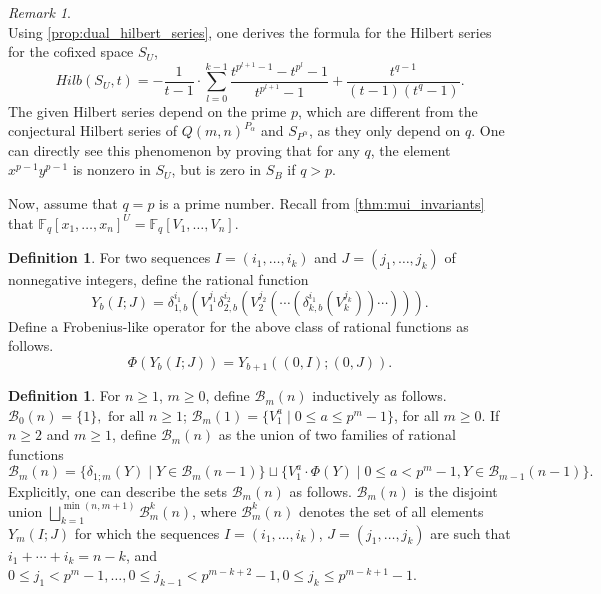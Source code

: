 \documentclass[12pt,a4paper]{report}
\theoremstyle{definition}
\newtheorem{definition}[theorem]{Definition}
\theoremstyle{remark}
\newtheorem*{remark}{Remark}
\theoremstyle{definition}
\begin{document}
\begin{remark}
\begin{equation*}
\end{equation*}
Using \cref{prop:dual_hilbert_series}, one derives the formula for the Hilbert series for the cofixed space $S_U$,
\begin{equation*}
    Hilb(S_U, t) = -\dfrac{1}{t-1}\cdot \sum\limits_{l=0}^{k-1}\dfrac{t^{p^{l+1}-1}-t^{p^l}-1}{t^{p^{l+1}}-1}+ \dfrac{t^{q-1}}{(t-1)(t^{q}-1)}.
\end{equation*}
The given Hilbert series depend on the prime $p$, which are different from the conjectural Hilbert series of $Q(m, n)^{P_{\alpha}}$ and $S_{P^{\alpha}}$, as they only depend on $q$. One can directly see this phenomenon by proving that for any $q$, the element $x^{p-1}y^{p-1}$ is nonzero in $S_U$, but is zero in $S_B$ if $q>p$.
\end{remark}
Now, assume that $q=p$ is a prime number. Recall from \cref{thm:mui_invariants} that $\mathbb{F}_q[x_1,\ldots, x_n]^U = \mathbb{F}_q[V_1, \ldots, V_n]$.
\begin{definition}\label{def:frob_operator}
    For two sequences $I = (i_1, \ldots, i_k)$ and $J = (j_1, \ldots, j_k)$ of nonnegative integers, define the rational function
    \begin{equation*}
        Y_b(I;J) = \delta_{1, b}^{i_1}(V_1^{j_1}\delta_{2, b}^{i_2}(V_2^{j_2}(\cdots (\delta_{k, b}^{i_1}(V_k^{j_k}))\cdots ))).
    \end{equation*}
    Define a Frobenius-like operator for the above class of rational functions as follows.
    \begin{equation*}
        \Phi(Y_b(I; J)) = Y_{b+1}((0, I); (0, J)).
    \end{equation*}
\end{definition}
\begin{definition}\label{def:basis_unipotent}
    For $n\geq 1$, $m\geq 0$, define $\mathcal{B}_m(n)$ inductively as follows. $\mathcal{B}_0(n) = \{1\}, \text{ for all } n\geq 1$; $\mathcal{B}_m(1) = \{V_1^a \mid 0\leq a\leq p^m-1\}$, for all $m\geq 0$. If $n\geq 2$ and $m\geq 1$, define $\mathcal{B}_m(n)$ as the union of two families of rational functions
    \begin{equation*}
        \mathcal{B}_m(n) = \{\delta_{1; m}(Y)\mid Y\in \mathcal{B}_m(n-1)\}\sqcup \{V_1^a\cdot \Phi(Y)\mid 0\leq a<p^m-1, Y\in \mathcal{B}_{m-1}(n-1)\}.
    \end{equation*}
    Explicitly, one can describe the sets $\mathcal{B}_m(n)$ as follows. $\mathcal{B}_m(n)$ is the disjoint union $\bigsqcup\limits_{k=1}^{\min{(n, m+1)}}\mathcal{B}_m^k(n)$, where $\mathcal{B}_m^k(n)$ denotes the set of all elements $Y_m(I; J)$ for which the sequences $I = (i_1, \ldots, i_k)$, $J = (j_1, \ldots, j_k)$ are such that $i_1+\cdots + i_k = n-k$, and $0\leq j_1<p^m-1, \ldots, 0\leq j_{k-1}<p^{m-k+2}-1, 0\leq j_k\leq p^{m-k+1}-1$.
\end{definition}
\end{document}
